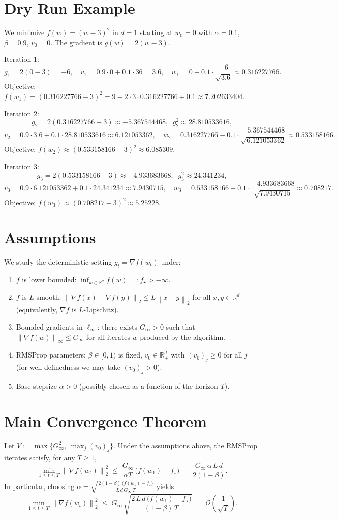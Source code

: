 \documentclass[11pt]{article}
\newcommand{\RR}{\mathbb{R}}
\newcommand{\norm}[1]{\left\lVert #1 \right\rVert}
\begin{document}
\section*{Dry Run Example}
We minimize $f(w)=(w-3)^2$ in $d=1$ starting at $w_0=0$ with $\alpha=0.1$, $\beta=0.9$, $v_0=0$. The gradient is $g(w)=2(w-3)$.

Iteration 1:
\[
g_1 = 2(0-3) = -6,\quad v_1 = 0.9\cdot 0 + 0.1\cdot 36 = 3.6,\quad
w_1 = 0 - 0.1\cdot\frac{-6}{\sqrt{3.6}} \approx 0.316227766.
\]
Objective: $f(w_1) = (0.316227766-3)^2 = 9 - 2\cdot 3 \cdot 0.316227766 + 0.1 \approx 7.202633404$.

Iteration 2:
\[
g_2 = 2(0.316227766-3) \approx -5.367544468,\;\; g_2^2 \approx 28.810533616,
\]
\[
v_2 = 0.9\cdot 3.6 + 0.1\cdot 28.810533616 \approx 6.121053362,\quad
w_2 = 0.316227766 - 0.1\cdot\frac{-5.367544468}{\sqrt{6.121053362}} \approx 0.533158166.
\]
Objective: $f(w_2) \approx (0.533158166-3)^2 \approx 6.085309$.

Iteration 3:
\[
g_3 = 2(0.533158166-3) \approx -4.933683668,\;\; g_3^2 \approx 24.341234,
\]
\[
v_3 = 0.9\cdot 6.121053362 + 0.1\cdot 24.341234 \approx 7.9430715,\quad
w_3 = 0.533158166 - 0.1\cdot\frac{-4.933683668}{\sqrt{7.9430715}} \approx 0.708217.
\]
Objective: $f(w_3) \approx (0.708217-3)^2 \approx 5.25228$.

\section*{Assumptions}
We study the deterministic setting $g_t = \nabla f(w_t)$ under:
\begin{enumerate}
\item $f$ is lower bounded: $\inf_{w\in\RR^d} f(w) =: f_\star > -\infty$.
\item $f$ is $L$-smooth: $\norm{\nabla f(x)-\nabla f(y)}_2 \le L\norm{x-y}_2$ for all $x,y\in\RR^d$ (equivalently, $\nabla f$ is $L$-Lipschitz).
\item Bounded gradients in $\ell_\infty$: there exists $G_\infty>0$ such that $\norm{\nabla f(w)}_\infty \le G_\infty$ for all iterates $w$ produced by the algorithm.
\item RMSProp parameters: $\beta\in[0,1)$ is fixed, $v_0\in\RR_+^d$ with $(v_0)_j\ge 0$ for all $j$ (for well-definedness we may take $(v_0)_j>0$).
\item Base stepsize $\alpha>0$ (possibly chosen as a function of the horizon $T$).
\end{enumerate}

\section*{Main Convergence Theorem}
Let $V:=\max\{G_\infty^2,\ \max_{j}(v_0)_j\}$. Under the assumptions above, the RMSProp iterates satisfy, for any $T\ge 1$,
\[
\min_{1\le t\le T}\norm{\nabla f(w_t)}_2^2
\;\le\;
\frac{G_\infty}{\alpha T}\,\big(f(w_1)-f_\star\big)
\;+\;
\frac{G_\infty\,\alpha\,L\,d}{2(1-\beta)}.
\]
In particular, choosing $\alpha=\sqrt{\frac{2(1-\beta)\,\big(f(w_1)-f_\star\big)}{L\,d\,G_\infty\,T}}$ yields
\[
\min_{1\le t\le T}\norm{\nabla f(w_t)}_2^2
\;\le\;
G_\infty\,\sqrt{\frac{2\,L\,d\,\big(f(w_1)-f_\star\big)}{(1-\beta)\,T}}
\;=\; \mathcal{O}\!\left(\frac{1}{\sqrt{T}}\right).
\]
\end{document}
